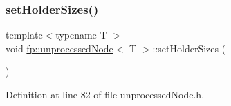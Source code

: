 \subsubsection{\texorpdfstring{set\+Holder\+Sizes()}{setHolderSizes()}\hspace{0.1cm}{\footnotesize\ttfamily [2/2]}}
{\footnotesize\ttfamily template$<$typename T $>$ \\
void \hyperlink{classfp_1_1unprocessedNode}{fp\+::unprocessed\+Node}$<$ T $>$\+::set\+Holder\+Sizes (\begin{DoxyParamCaption}{ }\end{DoxyParamCaption})\hspace{0.3cm}{\ttfamily [inline]}}



Definition at line 82 of file unprocessed\+Node.\+h.


